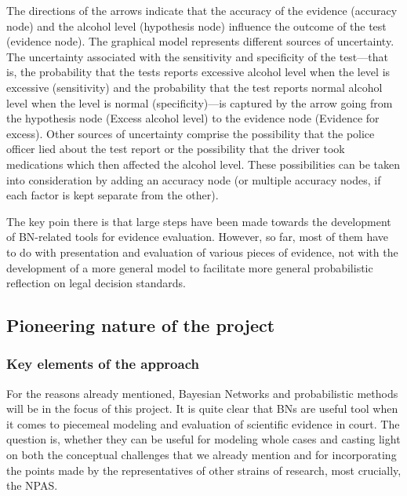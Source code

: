 \documentclass[11pt,dvipsnames,enabledeprecatedfontcommands]{scrartcl}
\begin{document}
\noindent The directions of the arrows indicate that the accuracy of the
evidence (accuracy node) and the alcohol level (hypothesis node)
influence the outcome of the test (evidence node). The graphical model
represents different sources of uncertainty. The uncertainty associated
with the sensitivity and specificity of the test---that is, the
probability that the tests reports excessive alcohol level when the
level is excessive (sensitivity) and the probability that the test
reports normal alcohol level when the level is normal (specificity)---is
captured by the arrow going from the hypothesis node
(\textsf{Excess alcohol level}) to the evidence node
(\textsf{Evidence for excess}). Other sources of uncertainty comprise
the possibility that the police officer lied about the test report or
the possibility that the driver took medications which then affected the
alcohol level. These possibilities can be taken into consideration by
adding an accuracy node (or multiple accuracy nodes, if each factor is
kept separate from the other).

The key poin there is that large steps have been made towards the
development of BN-related tools for evidence evaluation. However, so
far, most of them have to do with presentation and evaluation of various
pieces of evidence, not with the development of a more general model to
facilitate more general probabilistic reflection on legal decision
standards.

\subsection{Pioneering nature of the
project}\label{pioneering-nature-of-the-project}

\subsubsection{Key elements of the
approach}\label{key-elements-of-the-approach}

For the reasons already mentioned, Bayesian Networks and probabilistic
methods will be in the focus of this project. It is quite clear that BNs
are useful tool when it comes to piecemeal modeling and evaluation of
scientific evidence in court. The question is, whether they can be
useful for modeling whole cases and casting light on both the conceptual
challenges that we already mention and for incorporating the points made
by the representatives of other strains of research, most crucially, the
NPAS.
\end{document}
